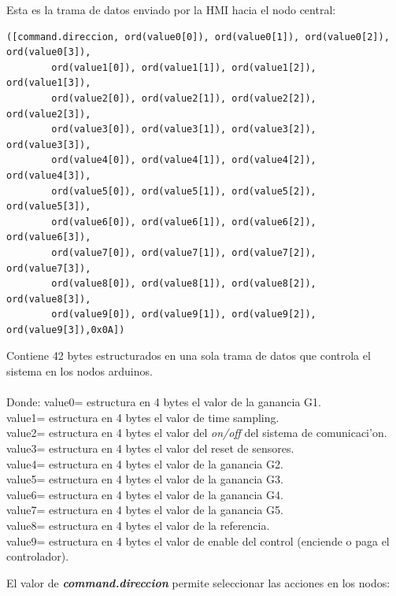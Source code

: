 Esta es la trama de datos enviado por la HMI hacia el nodo central:\\

{\small
\lstset{language=python, breaklines=true}
\begin{lstlisting}[frame=single]
([command.direccion, ord(value0[0]), ord(value0[1]), ord(value0[2]), ord(value0[3]),
        ord(value1[0]), ord(value1[1]), ord(value1[2]), ord(value1[3]),
        ord(value2[0]), ord(value2[1]), ord(value2[2]), ord(value2[3]),                             
        ord(value3[0]), ord(value3[1]), ord(value3[2]), ord(value3[3]),
        ord(value4[0]), ord(value4[1]), ord(value4[2]), ord(value4[3]),
        ord(value5[0]), ord(value5[1]), ord(value5[2]), ord(value5[3]),
        ord(value6[0]), ord(value6[1]), ord(value6[2]), ord(value6[3]),
        ord(value7[0]), ord(value7[1]), ord(value7[2]), ord(value7[3]),
        ord(value8[0]), ord(value8[1]), ord(value8[2]), ord(value8[3]),
        ord(value9[0]), ord(value9[1]), ord(value9[2]), ord(value9[3]),0x0A])                                

\end{lstlisting}
}
Contiene 42 bytes estructurados en una sola trama de datos que controla el sistema en los nodos arduinos.\\
\\
   Donde: value0= estructura en 4 bytes el valor de la ganancia G1.\\
					value1= estructura en 4 bytes el valor de time sampling.\\
					value2= estructura en 4 bytes el valor del \textit{on/off} del sistema de comunicaci'on.\\
					value3= estructura en 4 bytes el valor del reset de sensores.\\
					value4= estructura en 4 bytes el valor de la ganancia G2.\\
					value5= estructura en 4 bytes el valor de la ganancia G3.\\
					value6= estructura en 4 bytes el valor de la ganancia G4.\\
					value7= estructura en 4 bytes el valor de la ganancia G5.\\
					value8= estructura en 4 bytes el valor de la referencia.\\
					value9= estructura en 4 bytes el valor de enable del control (enciende o paga el controlador).
					
	El valor de \textit{\textbf{command.direccion}} permite seleccionar las acciones en los nodos:
	
